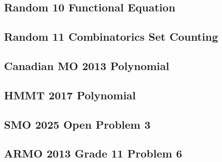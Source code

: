 \subsection{Random 10 Functional Equation}


\subsection{Random 11 Combinatorics Set Counting}


\subsection{Canadian MO 2013 Polynomial}


\subsection{HMMT 2017 Polynomial}


\subsection{SMO 2025 Open Problem 3}


\subsection{ARMO 2013 Grade 11 Problem 6}
